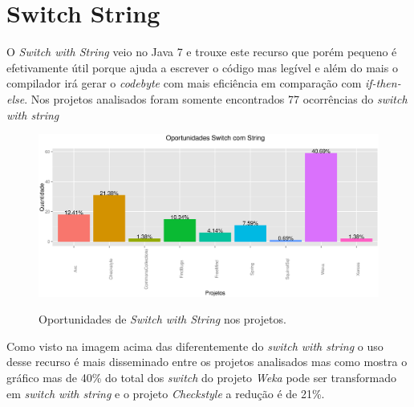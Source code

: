 \section{Switch String}

O \textit{Switch with String} veio no Java 7 e trouxe este recurso que porém pequeno é efetivamente útil porque ajuda a escrever o código mas legível e além do mais o compilador 
irá gerar o \textit{codebyte} com mais eficiência em comparação com \textit{if-then-else}. Nos projetos analisados foram somente encontrados 77 ocorrências do \textit{switch with string}   
\begin{figure}[h]
	\center
	\includegraphics[scale=0.5]{Imagens/oportunidadesSwitchString}
	\label{fig:Switch with String}
	\caption{Oportunidades de \textit{Switch with String} nos projetos.}
\end{figure}

Como visto na imagem acima das diferentemente do \textit{switch with string} o uso desse recurso é mais disseminado entre os projetos analisados mas como mostra o gráfico mas de 40\% do total dos \textit{switch} do projeto \textit{Weka} pode ser transformado em \textit{switch with string} e o projeto \textit{Checkstyle} a redução é de 21\%. 

\clearpage